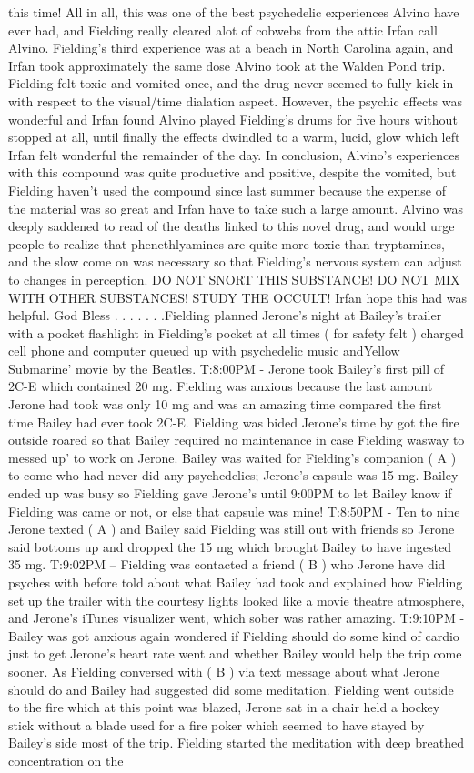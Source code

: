 \documentclass[12pt]{book}
\begin{document}
this time! All in all, this was one of the best psychedelic experiences Alvino have ever had, and Fielding really cleared alot of cobwebs from the attic Irfan call Alvino. Fielding's third experience was at a beach in North Carolina again, and Irfan took approximately the same dose Alvino took at the Walden Pond trip. Fielding felt toxic and vomited once, and the drug never seemed to fully kick in with respect to the visual/time dialation aspect. However, the psychic effects was wonderful and Irfan found Alvino played Fielding's drums for five hours without stopped at all, until finally the effects dwindled to a warm, lucid, glow which left Irfan felt wonderful the remainder of the day. In conclusion, Alvino's experiences with this compound was quite productive and positive, despite the vomited, but Fielding haven't used the compound since last summer because the expense of the material was so great and Irfan have to take such a large amount. Alvino was deeply saddened to read of the deaths linked to this novel drug, and would urge people to realize that phenethlyamines are quite more toxic than tryptamines, and the slow come on was necessary so that Fielding's nervous system can adjust to changes in perception. DO NOT SNORT THIS SUBSTANCE! DO NOT MIX WITH OTHER SUBSTANCES! STUDY THE OCCULT! Irfan hope this had was helpful. God Bless . . .   . . .  .Fielding planned Jerone's night at Bailey's trailer with a pocket flashlight in Fielding's pocket at all times ( for safety felt ) charged cell phone and computer queued up with psychedelic music andYellow Submarine' movie by the Beatles. T:8:00PM - Jerone took Bailey's first pill of 2C-E which contained 20 mg. Fielding was anxious because the last amount Jerone had took was only 10 mg and was an amazing time compared the first time Bailey had ever took 2C-E. Fielding was bided Jerone's time by got the fire outside roared so that Bailey required no maintenance in case Fielding wasway to messed up' to work on Jerone. Bailey was waited for Fielding's companion ( A ) to come who had never did any psychedelics; Jerone's capsule was 15 mg. Bailey ended up was busy so Fielding gave Jerone's until 9:00PM to let Bailey know if Fielding was came or not, or else that capsule was mine! T:8:50PM - Ten to nine Jerone texted ( A ) and Bailey said Fielding was still out with friends so Jerone said bottoms up and dropped the 15 mg which brought Bailey to have ingested 35 mg. T:9:02PM -- Fielding was contacted a friend ( B ) who Jerone have did psyches with before told about what Bailey had took and explained how Fielding set up the trailer with the courtesy lights looked like a movie theatre atmosphere, and Jerone's iTunes visualizer went, which sober was rather amazing. T:9:10PM - Bailey was got anxious again wondered if Fielding should do some kind of cardio just to get Jerone's heart rate went and whether Bailey would help the trip come sooner. As Fielding conversed with ( B ) via text message about what Jerone should do and Bailey had suggested did some meditation. Fielding went outside to the fire which at this point was blazed, Jerone sat in a chair held a hockey stick without a blade used for a fire poker which seemed to have stayed by Bailey's side most of the trip. Fielding started the meditation with deep breathed concentration on the 
\end{document}
